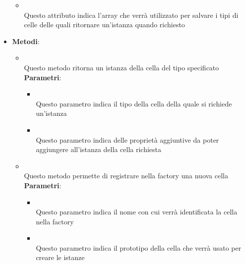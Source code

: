 \begin{itemize}
\begin{itemize}
\item {}
\\ Questo attributo indica l'array che verrà utilizzato per salvare i tipi di celle delle quali ritornare un'istanza quando richiesto
\end{itemize}
\item \textbf{Metodi}:
\begin{itemize}
\item {}
\\ Questo metodo ritorna un istanza della cella del tipo specificato
\\ \textbf{Parametri}:
\begin{itemize}
\item {}
\\ Questo parametro indica il tipo della cella della quale si richiede un'istanza
\item {}
\\ Questo parametro indica delle proprietà aggiuntive da poter aggiungere all'istanza della cella richiesta
\end{itemize}
\item {}
\\ Questo metodo permette di registrare nella factory una nuova cella
\\ \textbf{Parametri}:
\begin{itemize}
\item {}
\\ Questo parametro indica il nome con cui verrà identificata la cella nella factory
\item {}
\\ Questo parametro indica il prototipo della cella che verrà usato per creare le istanze
\end{itemize}
\end{itemize}
\end{itemize}

